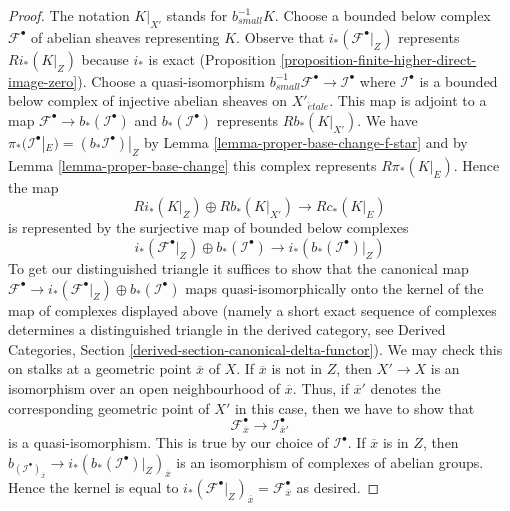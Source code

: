 \documentclass[10pt,a4paper]{amsart}
\theoremstyle{plain}
\theoremstyle{definition}
\theoremstyle{remark}
\numberwithin{equation}{subsection}
\def\etale{{\acute{e}tale}}
\begin{document}
\begin{proof}
The notation $K|_{X'}$ stands for $b_{small}^{-1}K$.
Choose a bounded below complex $\mathcal{F}^\bullet$
of abelian sheaves representing $K$. Observe that
$i_*(\mathcal{F}^\bullet|_Z)$ represents $Ri_*(K|_Z)$
because $i_*$ is exact
(Proposition \ref{proposition-finite-higher-direct-image-zero}).
Choose a quasi-isomorphism
$b_{small}^{-1}\mathcal{F}^\bullet \to \mathcal{I}^\bullet$
where $\mathcal{I}^\bullet$ is a bounded below complex of injective
abelian sheaves on $X'_\etale$. This map is adjoint to a map
$\mathcal{F}^\bullet \to b_*(\mathcal{I}^\bullet)$ and
$b_*(\mathcal{I}^\bullet)$ represents $Rb_*(K|_{X'})$.
We have $\pi_*(\mathcal{I}^\bullet|_E) = (b_*\mathcal{I}^\bullet)|_Z$
by Lemma \ref{lemma-proper-base-change-f-star} and by
Lemma \ref{lemma-proper-base-change} this complex represents
$R\pi_*(K|_E)$. Hence the map
$$
Ri_*(K|_Z) \oplus Rb_*(K|_{X'}) \to Rc_*(K|_E)
$$
is represented by the surjective map of bounded below complexes
$$
i_*(\mathcal{F}^\bullet|_Z) \oplus
b_*(\mathcal{I}^\bullet)
\to
i_*\left(b_*(\mathcal{I}^\bullet)|_Z\right)
$$
To get our distinguished triangle it suffices to show that
the canonical map
$\mathcal{F}^\bullet \to i_*(\mathcal{F}^\bullet|_Z) \oplus
b_*(\mathcal{I}^\bullet)$
maps quasi-isomorphically onto the kernel of the map
of complexes displayed above (namely a short exact sequence
of complexes determines a distinguished triangle in the derived
category, see
Derived Categories, Section \ref{derived-section-canonical-delta-functor}).
We may check this on stalks at a geometric point $\overline{x}$ of $X$.
If $\overline{x}$ is not in $Z$, then $X' \to X$ is an isomorphism
over an open neighbourhood of $\overline{x}$. Thus, if $\overline{x}'$
denotes the corresponding geometric point of $X'$ in this case, then
we have to show that
$$
\mathcal{F}^\bullet_{\overline{x}} \to \mathcal{I}^\bullet_{\overline{x}'}
$$
is a quasi-isomorphism. This is true by our choice of $\mathcal{I}^\bullet$.
If $\overline{x}$ is in $Z$, then
$b_(\mathcal{I}^\bullet)_{\overline{x}} \to 
i_*\left(b_*(\mathcal{I}^\bullet)|_Z\right)_{\overline{x}}$
is an isomorphism of complexes of abelian groups. Hence the
kernel is equal to
$i_*(\mathcal{F}^\bullet|_Z)_{\overline{x}} =
\mathcal{F}^\bullet_{\overline{x}}$ as desired.
\end{proof}
\end{document}

